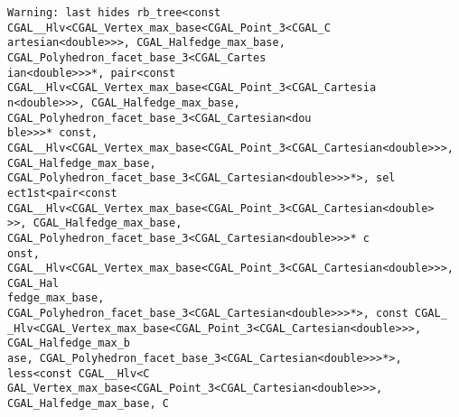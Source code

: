 
\xdef\oldBodyAttributes{\lcBodyAttributes}
\gdef\lcBodyAttributes{\lcRawHtml{background="Developers_manual/fig/background.gif" style="background: white url(Developers_manual/fig/background.gif); background-repeat: no-repeat; background-position: center top;"}}

\begin{titlepage}
\begin{lcTexBlock}
{\color[gray]{0.2}%
\verb+Warning: last hides rb_tree<const CGAL__Hlv<CGAL_Vertex_max_base<CGAL_Point_3<CGAL_C+\\
\verb+artesian<double>>>, CGAL_Halfedge_max_base, CGAL_Polyhedron_facet_base_3<CGAL_Cartes+\\
\verb+ian<double>>>*, pair<const CGAL__Hlv<CGAL_Vertex_max_base<CGAL_Point_3<CGAL_Cartesia+\\
\verb+n<double>>>, CGAL_Halfedge_max_base, CGAL_Polyhedron_facet_base_3<CGAL_Cartesian<dou+\\
\verb+ble>>>* const, CGAL__Hlv<CGAL_Vertex_max_base<CGAL_Point_3<CGAL_Cartesian<double>>>,+\\
\verb+CGAL_Halfedge_max_base, CGAL_Polyhedron_facet_base_3<CGAL_Cartesian<double>>>*>, sel+\\
\verb+ect1st<pair<const CGAL__Hlv<CGAL_Vertex_max_base<CGAL_Point_3<CGAL_Cartesian<double>+\\
\verb+>>, CGAL_Halfedge_max_base, CGAL_Polyhedron_facet_base_3<CGAL_Cartesian<double>>>* c+\\
\verb+onst, CGAL__Hlv<CGAL_Vertex_max_base<CGAL_Point_3<CGAL_Cartesian<double>>>, CGAL_Hal+\\
\verb+fedge_max_base, CGAL_Polyhedron_facet_base_3<CGAL_Cartesian<double>>>*>, const CGAL_+\\
\verb+_Hlv<CGAL_Vertex_max_base<CGAL_Point_3<CGAL_Cartesian<double>>>, CGAL_Halfedge_max_b+\\
\verb+ase, CGAL_Polyhedron_facet_base_3<CGAL_Cartesian<double>>>*>, less<const CGAL__Hlv<C+\\
\verb+GAL_Vertex_max_base<CGAL_Point_3<CGAL_Cartesian<double>>>, CGAL_Halfedge_max_base, C+\\
}
\end{lcTexBlock}
\end{titlepage}
